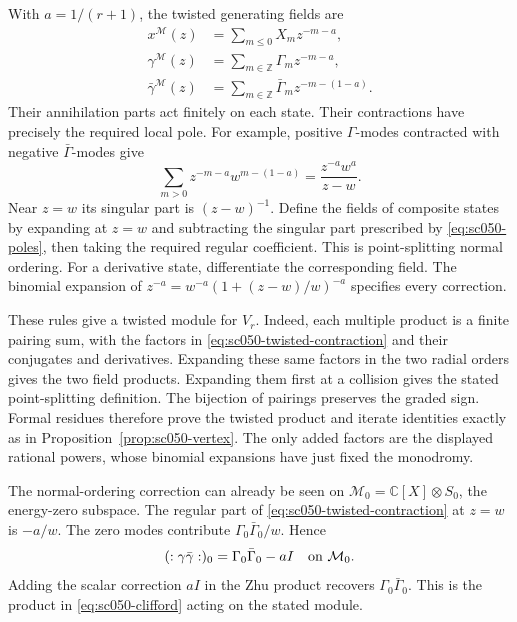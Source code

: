 With \(a=1/(r+1)\), the twisted generating fields are
\begin{align*}
 x^{\mathcal M}(z)&=\sum_{m\le0}X_mz^{-m-a},\\
 \gamma^{\mathcal M}(z)&=\sum_{m\in\mathbb Z}\Gamma_mz^{-m-a},\\
 \bar\gamma^{\mathcal M}(z)&=
       \sum_{m\in\mathbb Z}\bar\Gamma_mz^{-m-(1-a)}.
\end{align*}
Their annihilation parts act finitely on each state.
Their contractions have precisely the required local pole.
For example, positive \(\Gamma\)-modes contracted with negative
\(\bar\Gamma\)-modes give
\begin{equation}\label{eq:sc050-twisted-contraction}
 \sum_{m>0}z^{-m-a}w^{m-(1-a)}
       =\frac{z^{-a}w^a}{z-w}.
\end{equation}
Near \(z=w\) its singular part is \((z-w)^{-1}\).
Define the fields of composite states by expanding at \(z=w\)
and subtracting the singular part prescribed by
\eqref{eq:sc050-poles}, then taking the required regular
coefficient. This is point-splitting normal ordering. For a
derivative state, differentiate the corresponding field.
The binomial expansion of \(z^{-a}=w^{-a}(1+(z-w)/w)^{-a}\)
specifies every correction.

These rules give a twisted module for \(V_r\). Indeed, each
multiple product is a finite pairing sum, with the factors in
\eqref{eq:sc050-twisted-contraction} and their conjugates and
derivatives. Expanding these same factors in the two radial
orders gives the two field products. Expanding them first at a
collision gives the stated point-splitting definition.
The bijection of pairings preserves the graded sign.
Formal residues therefore prove the twisted product and
iterate identities exactly as in
Proposition~\ref{prop:sc050-vertex}.
The only added factors are the displayed rational powers, whose
binomial expansions have just fixed the monodromy.

The normal-ordering correction can already be seen on
\(\mathcal M_0=\mathbb C[X]\otimes S_0\), the energy-zero subspace.
The regular part of \eqref{eq:sc050-twisted-contraction} at
\(z=w\) is \(-a/w\). The zero modes contribute
\(\Gamma_0\bar\Gamma_0/w\). Hence
\[
 (: \gamma\bar\gamma :)_0
       =\Gamma_0\bar\Gamma_0-aI
       \quad\hbox{on }\mathcal M_0.
\]
Adding the scalar correction \(aI\) in the Zhu product recovers
\(\Gamma_0\bar\Gamma_0\). This is the product in
\eqref{eq:sc050-clifford} acting on the stated module.

